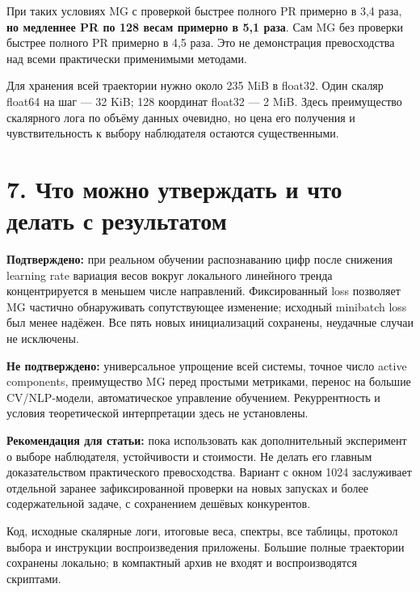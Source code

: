 \documentclass[10pt,a4paper]{article}
\begin{document}
При таких условиях MG с проверкой быстрее полного PR примерно в 3,4 раза, \textbf{но медленнее PR по 128 весам примерно в 5,1 раза}. Сам MG без проверки быстрее полного PR примерно в 4,5 раза. Это не демонстрация превосходства над всеми практически применимыми методами.

Для хранения всей траектории нужно около 235 MiB в float32. Один скаляр float64 на шаг --- 32 KiB; 128 координат float32 --- 2 MiB. Здесь преимущество скалярного лога по объёму данных очевидно, но цена его получения и чувствительность к выбору наблюдателя остаются существенными.

\section*{7. Что можно утверждать и что делать с результатом}

\textbf{Подтверждено:} при реальном обучении распознаванию цифр после снижения learning rate вариация весов вокруг локального линейного тренда концентрируется в меньшем числе направлений. Фиксированный loss позволяет MG частично обнаруживать сопутствующее изменение; исходный minibatch loss был менее надёжен. Все пять новых инициализаций сохранены, неудачные случаи не исключены.

\textbf{Не подтверждено:} универсальное упрощение всей системы, точное число active components, преимущество MG перед простыми метриками, перенос на большие CV/NLP-модели, автоматическое управление обучением. Рекуррентность и условия теоретической интерпретации здесь не установлены.

\textbf{Рекомендация для статьи:} пока использовать как дополнительный эксперимент о выборе наблюдателя, устойчивости и стоимости. Не делать его главным доказательством практического превосходства. Вариант с окном 1024 заслуживает отдельной заранее зафиксированной проверки на новых запусках и более содержательной задаче, с сохранением дешёвых конкурентов.

Код, исходные скалярные логи, итоговые веса, спектры, все таблицы, протокол выбора и инструкции воспроизведения приложены. Большие полные траектории сохранены локально; в компактный архив не входят и воспроизводятся скриптами.
\end{document}
